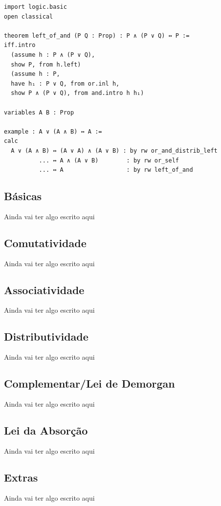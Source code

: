 \begin{lstlisting}
import logic.basic
open classical

theorem left_of_and (P Q : Prop) : P ∧ (P ∨ Q) ↔ P :=
iff.intro
  (assume h : P ∧ (P ∨ Q),
  show P, from h.left)
  (assume h : P,
  have h₁ : P ∨ Q, from or.inl h,
  show P ∧ (P ∨ Q), from and.intro h h₁)

variables A B : Prop

example : A ∨ (A ∧ B) ↔ A :=
calc
  A ∨ (A ∧ B) ↔ (A ∨ A) ∧ (A ∨ B) : by rw or_and_distrib_left
          ... ↔ A ∧ (A ∨ B)        : by rw or_self
          ... ↔ A                  : by rw left_of_and
\end{lstlisting}

  \subsection{Básicas}
  Ainda vai ter algo escrito aqui

  \subsection{Comutatividade}
  Ainda vai ter algo escrito aqui

  \subsection{Associatividade}
  Ainda vai ter algo escrito aqui

  \subsection{Distributividade}
  Ainda vai ter algo escrito aqui

  \subsection{Complementar/Lei de Demorgan}
  Ainda vai ter algo escrito aqui

  \subsection{Lei da Absorção}
  Ainda vai ter algo escrito aqui

  \subsection{Extras}
  Ainda vai ter algo escrito aqui

